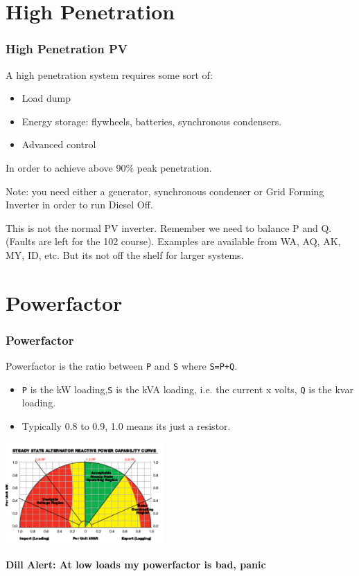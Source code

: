 \documentclass{beamer}
\def\dill#1{\textcolor{RawSienna}{\textbf{Dill Alert: #1}}}
\begin{document}
\section{High Penetration}
\begin{frame}\frametitle{High Penetration PV}
A high penetration system requires some sort of:

\begin{itemize}
\item Load dump
\item Energy storage: flywheels, batteries, synchronous condensers.
\item Advanced control
\end{itemize}

In order to achieve above 90\% peak penetration.
\pause

Note: you need either a generator, synchronous condenser or
Grid Forming Inverter in order to run Diesel Off. 

This is not the normal 
PV inverter. Remember we need to balance P and Q.
(Faults are left for the 102 course).
\pause 
\vfill
Examples are available from WA, AQ, AK, MY, ID, etc.
\vfill
But its not off the shelf for larger systems.
\end{frame}

\section{Powerfactor}
\begin{frame}\frametitle{Powerfactor}
Powerfactor is the ratio between \texttt{P} and \texttt{S} where
\texttt{S=P+Q}.
\begin{itemize}
\item \texttt{P} is the kW loading,\texttt{S} is the kVA loading,
  i.e. the current x volts, \texttt{Q} is the kvar loading.
\pause
\item Typically 0.8 to 0.9, 1.0 means its just a resistor.
\end{itemize}
\pause
\includegraphics[width=6cm]{pf.pdf}
\pause

\dill{At low loads my powerfactor is bad, panic}
\end{frame}
\end{document}
